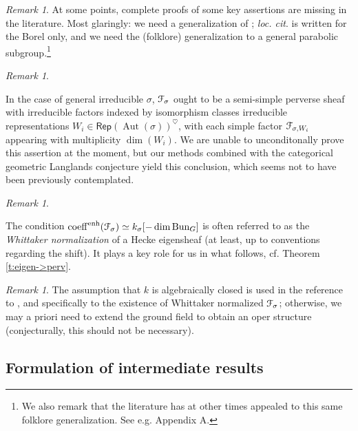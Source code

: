 \documentclass[reqno,11pt]{amsart}
\numberwithin{equation}{subsection}
\theoremstyle{remark}
\newtheorem{rem}[thm]{Remark}
\newcommand{\sF}{{\EuScript F}}
\newcommand{\on}{\operatorname}
\newcommand{\Aut}{\on{Aut}}
\newcommand{\Rep}{\mathsf{Rep}}
\newcommand{\Bun}{\on{Bun}}
\newcommand{\heart}{\heartsuit}
\newcommand{\coeff}{\on{coeff}}
\newcommand{\enh}{\on{enh}}
\begin{document}
\begin{rem}

At some points, complete proofs of some key assertions are missing in 
the literature. Most glaringly: we need 
a generalization of \cite{bg-deformations}; \emph{loc. cit}. is
written for the Borel only, and we need the (folklore) generalization
to a general parabolic subgroup.\footnote{We also remark that the 
literature has at other times appealed
to this same folklore generalization. See e.g. \cite{potential} Appendix A.} 

\end{rem}

\begin{rem}\label{r:jh-genl}

In the case of general irreducible $\sigma$, $\sF_{\sigma}$ ought to be a semi-simple 
perverse sheaf with irreducible factors indexed by isomorphism
classes irreducible representations $W_i \in \Rep(\Aut(\sigma))^{\heart}$,
with each simple factor $\sF_{\sigma,W_i}$ appearing with multiplicity
$\dim(W_i)$. We are unable to unconditonally prove this assertion at the moment,
but our methods combined with the categorical geometric Langlands
conjecture yield this conclusion, which seems not to have been previously
contemplated.

\end{rem}

\begin{rem}\label{r:whit-norm}

The condition $\coeff^{\enh}(\sF_{\sigma}) \simeq k_{\sigma}[-\dim \Bun_G] $
is often referred to as the \emph{Whittaker normalization} of
a Hecke eigensheaf (at least, up to conventions regarding the shift).
It plays a key role for us in what follows, cf. Theorem \ref{t:eigen->perv}.

\end{rem}

\begin{rem}

The assumption that $k$ is algebraically closed is used in the reference
to \cite{dima-opers}, and specifically to the existence of Whittaker
normalized $\sF_{\sigma}$; otherwise, we may a priori need to extend the ground field
to obtain an oper structure (conjecturally, this should not be necessary).

\end{rem}

\subsection{Formulation of intermediate results}
\end{document}

